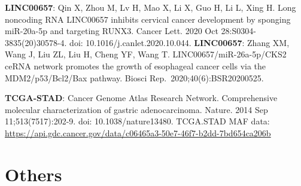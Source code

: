 \documentclass[
  12pt,
]{book}
\begin{document}
\textbf{LINC00657}: Qin X, Zhou M, Lv H, Mao X, Li X, Guo H, Li L, Xing H. Long noncoding RNA LINC00657 inhibits cervical cancer development by sponging miR-20a-5p and targeting RUNX3. Cancer Lett. 2020 Oct 28:S0304-3835(20)30578-4. doi: 10.1016/j.canlet.2020.10.044.
\textbf{LINC00657}: Zhang XM, Wang J, Liu ZL, Liu H, Cheng YF, Wang T. LINC00657/miR-26a-5p/CKS2 ceRNA network promotes the growth of esophageal cancer cells via the MDM2/p53/Bcl2/Bax pathway. Biosci Rep.~2020;40(6):BSR20200525.

\textbf{TCGA-STAD}: Cancer Genome Atlas Research Network. Comprehensive molecular characterization of gastric adenocarcinoma. Nature. 2014 Sep 11;513(7517):202-9. doi: 10.1038/nature13480.
TCGA.STAD MAF data: \url{https://api.gdc.cancer.gov/data/c06465a3-50e7-46f7-b2dd-7bd654ca206b}

\hypertarget{others}{%
\section{Others}\label{others}}
\end{document}
